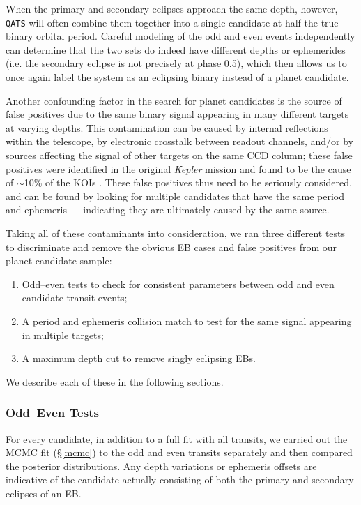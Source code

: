 \documentclass[twocolumn]{aastex62}
\newcommand{\project}[1]{\textsl{#1}}
\newcommand{\pipeline}[1]{\texttt{#1}}
\begin{document}
When the primary and secondary eclipses approach the same depth,
however, \pipeline{QATS} will often combine them together into a
single candidate at half the true binary orbital period. Careful
modeling of the odd and even events independently can determine that
the two sets do indeed have different depths or ephemerides (i.e. the
secondary eclipse is not precisely at phase 0.5), which then allows us
to once again label the system as an eclipsing binary instead of a
planet candidate.

Another confounding factor in the search for planet candidates is the
source of false positives due to the same binary signal appearing in
many different targets at varying depths. This contamination can be
caused by internal reflections within the telescope, by electronic
crosstalk between readout channels, and/or by sources affecting the
signal of other targets on the same CCD column; these false positives
were identified in the original \project{Kepler} mission and found to
be the cause of $\sim$10\% of the KOIs \citep{cou14}. These false
positives thus need to be seriously considered, and can be found by
looking for multiple candidates that have the same period and
ephemeris --- indicating they are ultimately caused by the same
source.

Taking all of these contaminants into consideration, we ran three
different tests to discriminate and remove the obvious EB cases and
false positives from our planet candidate sample:
\begin{enumerate}
\item Odd--even tests to check for consistent parameters between odd
  and even candidate transit events;
\item A period and ephemeris collision match to test for the same
  signal appearing in multiple targets;
\item A maximum depth cut to remove singly eclipsing EBs.
\end{enumerate}
We describe each of these in the following sections.


\subsubsection{Odd--Even Tests}
\label{oddeven}

For every candidate, in addition to a full fit with all transits, we
carried out the MCMC fit (\S\ref{mcmc}) to the odd and even transits
separately and then compared the posterior distributions.  Any depth
variations or ephemeris offsets are indicative of the candidate
actually consisting of both the primary and secondary eclipses of an
EB.
\end{document}
